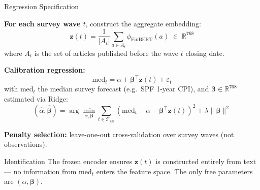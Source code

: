 \documentclass[aspectratio=169, 11pt]{beamer}
\newcommand{\R}{\mathbb{R}}
\newcommand{\med}{\mathrm{med}}
\newcommand{\zt}{\mathbf{z}(t)}
\newcommand{\bt}{\bm{\beta}}
\newcommand{\lam}{\lambda}
\newcommand{\eps}{\varepsilon}
\begin{document}
\begin{frame}{Regression Specification}

\textbf{For each survey wave $t$}, construct the aggregate embedding:
\[
  \zt = \frac{1}{|A_t|} \sum_{a \in A_t} \phi_{\text{FinBERT}}(a) \;\in\; \R^{768}
\]
where $A_t$ is the set of articles published before the wave $t$ closing date.

\vspace{0.4cm}
\textbf{Calibration regression:}
\[
  \boxed{\med_t = \alpha + \bt^\top \zt + \eps_t}
\]
with $\med_t$ the median survey forecast (e.g.\ SPF 1-year CPI), and $\bt \in \R^{768}$ estimated via Ridge:
\[
  (\hat{\alpha}, \hat{\bt}) = \arg\min_{\alpha, \bt} \sum_{t \in \mathcal{T}_{\text{cal}}} \left(\med_t - \alpha - \bt^\top \zt\right)^2 + \lam \|\bt\|^2
\]

\textbf{Penalty selection:} leave-one-out cross-validation over survey waves (not observations).

\vspace{0.3cm}
\begin{alertblock}{Identification}
The frozen encoder ensures $\zt$ is constructed entirely from text --- no information from $\med_t$ enters the feature space. The only free parameters are $(\alpha, \bt)$.
\end{alertblock}

\end{frame}
\end{document}
